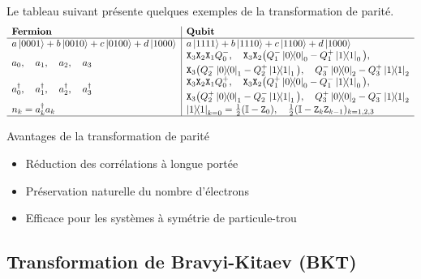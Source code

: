 \documentclass[12pt,a4paper,svgnames,x11names,rgb,table]{article} %
\numberwithin{equation}{section} %
\numberwithin{figure}{section} %
\numberwithin{table}{section} %
\begin{document}
Le tableau suivant présente quelques exemples de la transformation de parité.
$$
\begin{array}{l|l}
\textbf{Fermion} & \textbf{Qubit} \\ \hline
a\ket{0001}+b\ket{0010}+c\ket{0100}+d\ket{1000} & a\ket{1111}+b\ket{1110}+c\ket{1100}+d\ket{1000}  \\
a_0 ,\quad a_1 ,\quad a_2 ,\quad a_3 &
\begin{split}
&\mathtt{X}_3\mathtt{X}_2\mathtt{X}_1Q^-_0 ,\quad \mathtt{X}_3\mathtt{X}_2\big( Q^-_1\op{0}_0 - Q^+_1\op{1}_0 \big) ,\\ &\mathtt{X}_3\big( Q^-_2\op{0}_1 - Q^+_2\op{1}_1 \big) ,\quad Q^-_3\op{0}_2 - Q^+_3\op{1}_2
\end{split} \\
a^\dagger_0 ,\quad a^\dagger_1 ,\quad a^\dagger_2 ,\quad a^\dagger_3 &
\begin{split}
& \mathtt{X}_3\mathtt{X}_2\mathtt{X}_1Q^+_0 ,\quad \mathtt{X}_3\mathtt{X}_2\big( Q^+_1\op{0}_0 - Q^-_1\op{1}_0 \big) ,\\ &\mathtt{X}_3\big( Q^+_2\op{0}_1 - Q^-_2\op{1}_1 \big) ,\quad Q^+_3\op{0}_2 - Q^-_3\op{1}_2 
\end{split}\\
n_k = a^\dagger_k a_k & \op{1}_{k=0}=\frac12(\mathbb{I} - \mathtt{Z}_0) ,\quad  \frac12(\mathbb{I} - \mathtt{Z}_k\mathtt{Z}_{k-1})_{k=1,2,3}\\\hline
\end{array}
$$

\begin{remark}{Avantages de la transformation de parité}{}
\begin{itemize}
\item Réduction des corrélations à longue portée
\item Préservation naturelle du nombre d'électrons
\item Efficace pour les systèmes à symétrie de particule-trou
\end{itemize}
\end{remark}


\subsection{Transformation de Bravyi-Kitaev (BKT)}
\end{document}
